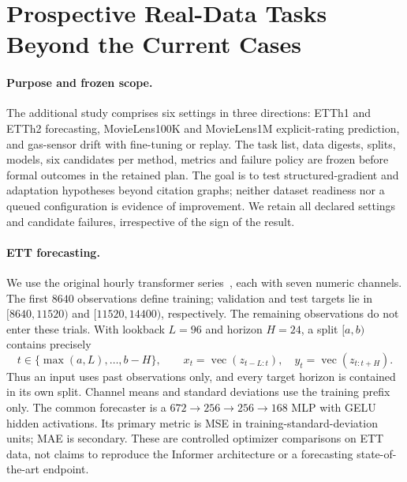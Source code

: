 \section{Prospective Real-Data Tasks Beyond the Current Cases}
\label{app:prospective-real-tasks}
\paragraph{Purpose and frozen scope.}
The additional study comprises six settings in three directions: ETTh1 and ETTh2 forecasting, MovieLens100K and MovieLens1M explicit-rating prediction, and gas-sensor drift with fine-tuning or replay. The task list, data digests, splits, models, six candidates per method, metrics and failure policy are frozen before formal outcomes in the retained plan. The goal is to test structured-gradient and adaptation hypotheses beyond citation graphs; neither dataset readiness nor a queued configuration is evidence of improvement. We retain all declared settings and candidate failures, irrespective of the sign of the result.

\paragraph{ETT forecasting.}
We use the original hourly transformer series~\citep{zhou2021informer}, each with seven numeric channels. The first $8640$ observations define training; validation and test targets lie in $[8640,11520)$ and $[11520,14400)$, respectively. The remaining observations do not enter these trials. With lookback $L=96$ and horizon $H=24$, a split $[a,b)$ contains precisely
\[
 t\in\{\max(a,L),\ldots,b-H\},\qquad
 x_t=\operatorname{vec}(z_{t-L:t}),\quad
 y_t=\operatorname{vec}(z_{t:t+H}).
\]
Thus an input uses past observations only, and every target horizon is contained in its own split. Channel means and standard deviations use the training prefix only. The common forecaster is a $672\to256\to256\to168$ MLP with GELU hidden activations. Its primary metric is MSE in training-standard-deviation units; MAE is secondary. These are controlled optimizer comparisons on ETT data, not claims to reproduce the Informer architecture or a forecasting state-of-the-art endpoint.

